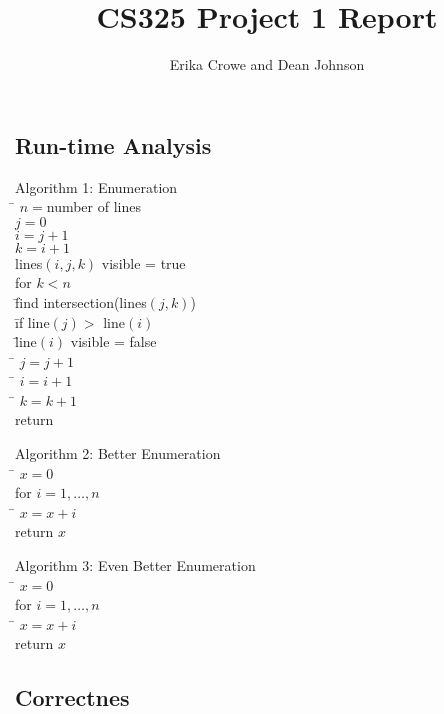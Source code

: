 \documentclass{article}
\title{CS325 Project 1 Report}
\author{Erika Crowe and Dean Johnson}
\begin{document}
\maketitle


\subsection*{Run-time Analysis}


\begin{tabbing}
  {\sc Algorithm 1: Enumeration}\\
  \qquad \= $n = $number of lines \\
  \> $j = 0$ \\
  \> $i = j+1$\\
  \> $k = i+1$\\
  \> lines$(i,j,k)$ visible = true\\
  \> for $k < n$\\
  \> \qquad \= find intersection(lines$(j,k)$)\\
  \> \qquad \= if line$(j) >$ line$(i)$\\
  \> \qquad \= line$(i)$ visible = false\\
  \> \qquad \= $j = j+1$\\
  \> \qquad \= $i = i+1$\\
  \> \qquad \= $k = k+1$\\
  \> return
\end{tabbing}

\begin{tabbing}
  {\sc Algorithm 2: Better Enumeration}\\
  \qquad \= $x = 0$ \\
  \> for $i = 1, \ldots, n$\\
  \> \qquad \= $x = x+i$\\

  \> return $x$
\end{tabbing}

\begin{tabbing}
  {\sc Algorithm 3: Even Better Enumeration}\\
  \qquad \= $x = 0$ \\
  \> for $i = 1, \ldots, n$\\
  \> \qquad \= $x = x+i$\\
  \> return $x$
\end{tabbing}

\subsection*{Correctnes}
\end{document}
